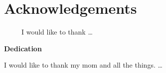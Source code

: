 \pagebreak

\section*{\large{Acknowledgements}}
\ \ \ \ \ I would like to thank \ldots
\pagebreak

\vspace*{\fill} %
\begin{center} %

\begin{large}
\textbf{Dedication} \\
\end{large}
\indent I would like to thank my mom and all the things. \ldots

\end{center}
\vspace*{\fill}
\pagebreak

\tableofcontents
\pagebreak

\listoftables
\pagebreak

\listoffigures
\pagebreak